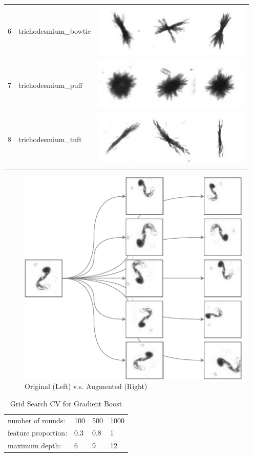 \documentclass[11pt,oneside,a4paper]{article}
\numberwithin{equation}{section}
\begin{document}
\begin{table}[ht!]
\begin{tabular}{m{3pt} m{130pt} m{120pt}}
6 & trichodesmium\_bowtie & \includegraphics[scale=0.4]{./fig/trichodesmium_bowtie.png}\\
7 & trichodesmium\_puff & \includegraphics[scale=0.4]{./fig/trichodesmium_puff.png}\\
8 & trichodesmium\_tuft & \includegraphics[scale=0.4]{./fig/trichodesmium_tuft.png}\\
\bottomrule
\label{sample from dataset}
\end{tabular}
\end{table}

\begin{figure}[ht!]
\centering
\small
\includegraphics[width=.6\linewidth]{fig/CSci-5525-data-augmentation-crop.pdf}
\caption{Original (Left) v.s. Augmented (Right)}
\label{augmentation}
\end{figure}

\begin{table}[ht]
\centering
\small
\caption{Grid Search CV for Gradient Boost}
\label{cv:gb}
\begin{tabular}{llll}
\toprule
number of rounds: & 100 & 500 & 1000 \\
feature proportion:     & 0.3 & 0.8 & 1   \\
maximum depth:    & 6   & 9   & 12  \\
\bottomrule
\end{tabular}
\end{table}
\end{document}
